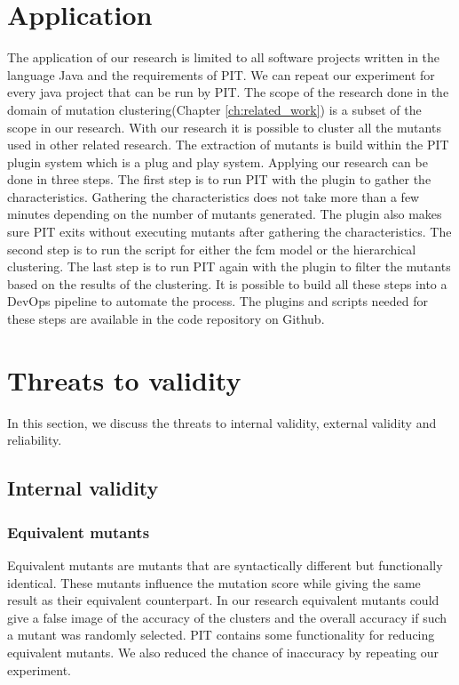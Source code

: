 \documentclass[../main]{subfiles}
\begin{document}
\section{Application}
The application of our research is limited to all software projects written in the language Java and the requirements of PIT\cite{pit}.
We can repeat our experiment for every java project that can be run by PIT.
The scope of the research done in the domain of mutation clustering(Chapter \ref{ch:related_work}) is a subset of the scope in our research.
With our research it is possible to cluster all the mutants used in other related research.
The extraction of mutants is build within the PIT plugin system which is a plug and play system.
Applying our research can be done in three steps.
The first step is to run PIT with the plugin to gather the characteristics.
Gathering the characteristics does not take more than a few minutes depending on the number of mutants generated.
The plugin also makes sure PIT exits without executing mutants after gathering the characteristics.
The second step is to run the script for either the \acrshort{fcm} model or the hierarchical clustering.
The last step is to run PIT again with the plugin to filter the mutants based on the results of the clustering.
It is possible to build all these steps into a DevOps pipeline to automate the process. 
The plugins and scripts needed for these steps are available in the code repository on Github\cite{rbasarat-repo}.

\section{Threats to validity}
In this section, we discuss the threats to internal validity, external validity and reliability.
\subsection{Internal validity}
\subsubsection{Equivalent mutants}
Equivalent mutants are mutants that are syntactically different but functionally identical.
These mutants influence the mutation score while giving the same result as their equivalent counterpart.
In our research equivalent mutants could give a false image of the accuracy of the clusters and the overall accuracy if such a mutant was randomly selected.
PIT contains some functionality for reducing equivalent mutants\cite{pit}.
We also reduced the chance of inaccuracy by repeating our experiment.
\end{document}
